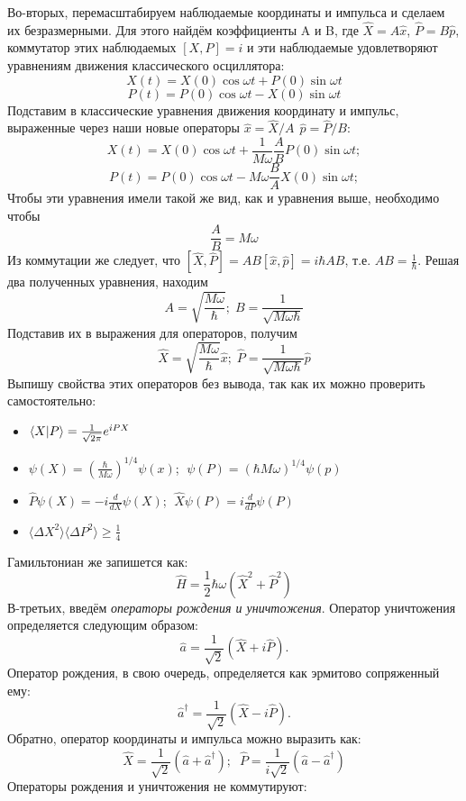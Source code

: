 Во-вторых, перемасштабируем наблюдаемые координаты и импульса и сделаем их безразмерными. Для этого найдём коэффициенты A и B, где $\hat{X} = A\hat{x}$, $\hat{P} = B\hat{p}$, коммутатор этих наблюдаемых $\left[X, P \right] = i$  и эти наблюдаемые удовлетворяют уравнениям движения классического осциллятора:
\[
X(t) = X(0)\cos\omega t + P(0)\sin\omega t
\]
\[
P(t) = P(0)\cos \omega t - X(0) \sin\omega t
\]
Подставим в классические уравнения движения координату и импульс, выраженные через наши новые операторы $\hat{x} = \hat{X}/A\,\;\hat{p} = \hat{P}/B$:
\[
X(t) = X(0)\cos \omega t + \frac{1}{M\omega}\frac{A}{B}P(0)\sin\omega t;
\]
\[
P(t) = P(0)\cos \omega t - M\omega\frac{B}{A}X(0)\sin\omega t;
\]
Чтобы эти уравнения имели такой же вид, как и уравнения выше, необходимо чтобы
\[
\frac{A}{B} = M\omega
\]
Из коммутации же следует, что $\left[\hat{X}, \hat{P}\right] = AB\left[\hat{x},\hat{p}\right] = i\hbar AB$, т.е. $AB = \frac{1}{\hbar}$. Решая два полученных уравнения, находим
\[
A = \sqrt{\frac{M\omega}{\hbar}}; \; B = \frac{1}{\sqrt{M\omega \hbar}}
\]
Подставив их в выражения для операторов, получим
\[
\hat{X} = \sqrt{\frac{M\omega}{\hbar}}\hat{x}; \; \hat{P} = \frac{1}{\sqrt{M\omega \hbar}}\hat{p}
\]
Выпишу свойства этих операторов без вывода, так как их можно проверить самостоятельно:
\begin{itemize}
    \item $\bra{X}\ket{P} = \frac{1}{\sqrt{2\pi}}e^{iPX}$
    \item $\psi(X) = \left(\frac{\hbar}{M\omega}\right)^{1/4}\psi(x)$; $\;\psi(P) = \left(\hbar M\omega \right)^{1/4}\psi(p)$
    \item $\hat{P}\psi(X) = -i\frac{d}{dX}\psi(X)$;   $\;\hat{X}\psi(P) = i\frac{d}{dP}\psi(P)$
    \item $\langle\Delta X^2\rangle\langle\Delta P^2\rangle \geq \frac{1}{4}$
\end{itemize}
Гамильтониан же запишется как:
\[
\hat{H} = \frac{1}{2}\hbar\omega(\hat{X}^2 + \hat{P}^2)
\]
В-третьих, введём \textit{операторы рождения и уничтожения}. Оператор уничтожения определяется следующим образом:
\[
\hat{a} = \frac{1}{\sqrt{2}}\left(\hat{X} + i\hat{P} \right).
\]
Оператор рождения, в свою очередь, определяется как эрмитово сопряженный ему:
\[
\hat{a}^{\dagger} = \frac{1}{\sqrt{2}}\left(\hat{X} - i\hat{P} \right).
\]
Обратно, оператор координаты и импульса можно выразить как:
\[
\hat{X} = \frac{1}{\sqrt{2}}(\hat{a} + \hat{a}^{\dagger}); \;\; \hat{P} = \frac{1}{i\sqrt{2}}(\hat{a} - \hat{a}^{\dagger})
\]
Операторы рождения и уничтожения не коммутируют:
